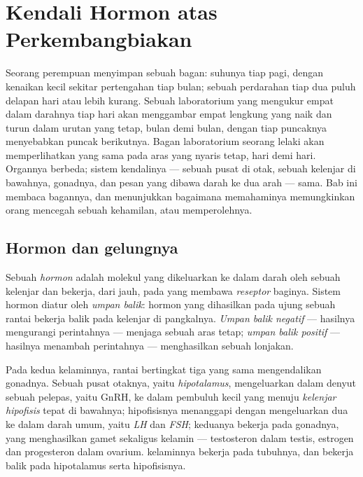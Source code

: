 \chapter{Kendali Hormon atas Perkembangbiakan}\label{ch:g11:hormones-and-reproduction}

Seorang perempuan menyimpan sebuah bagan: suhunya tiap pagi, dengan
kenaikan kecil sekitar pertengahan tiap bulan; sebuah perdarahan tiap
dua puluh delapan hari atau lebih kurang. Sebuah laboratorium yang
mengukur empat  dalam darahnya tiap hari akan menggambar empat
lengkung yang naik dan turun dalam urutan yang tetap, bulan demi bulan,
dengan tiap puncaknya menyebabkan puncak berikutnya. Bagan laboratorium
seorang lelaki akan memperlihatkan  yang sama pada aras yang
nyaris tetap, hari demi hari. Organnya berbeda; sistem kendalinya ---
sebuah pusat di otak, sebuah kelenjar di bawahnya, gonadnya, dan pesan
yang dibawa darah ke dua arah --- sama. Bab ini membaca bagannya, dan
menunjukkan bagaimana memahaminya memungkinkan orang mencegah sebuah
kehamilan, atau memperolehnya.

\section{Hormon dan gelungnya}

\begin{definition}\label{def:g11:hormones-and-reproduction:hormone}
Sebuah \emph{hormon} adalah molekul yang dikeluarkan ke
dalam darah oleh sebuah kelenjar dan bekerja, dari jauh, pada  yang
membawa \emph{reseptor} baginya. Sistem hormon diatur oleh \emph{umpan
balik}: hormon yang dihasilkan pada ujung sebuah
rantai bekerja balik pada kelenjar di pangkalnya. \emph{Umpan balik
negatif} --- hasilnya mengurangi perintahnya --- menjaga sebuah aras
tetap; \emph{umpan balik positif} --- hasilnya menambah perintahnya ---
menghasilkan sebuah lonjakan.
\end{definition}

\begin{proposition}\label{prop:g11:hormones-and-reproduction:chain}
Pada kedua kelaminnya, rantai bertingkat tiga yang sama mengendalikan
gonadnya. Sebuah pusat otaknya, yaitu \emph{hipotalamus}, mengeluarkan
dalam denyut sebuah  pelepas, yaitu GnRH, ke dalam pembuluh kecil
yang menuju \emph{kelenjar hipofisis} tepat di bawahnya; hipofisisnya
menanggapi dengan mengeluarkan dua  ke dalam darah umum, yaitu
\emph{LH} dan \emph{FSH}; keduanya bekerja pada gonadnya, yang
menghasilkan gamet sekaligus  kelamin --- testosteron dalam
testis, estrogen dan progesteron dalam ovarium.  kelaminnya
bekerja pada tubuhnya, dan bekerja balik pada hipotalamus serta
hipofisisnya.
\end{proposition}
\admitted


